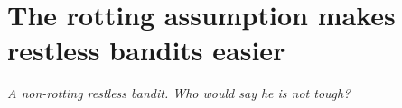 \chapter{The rotting assumption makes restless bandits easier}
\label{ch:restless}
\vspace{-3cm}
\begin{flushright}
\emph{A non-rotting restless bandit. Who would say he is not tough?}
\end{flushright}
\vspace{.85cm}



